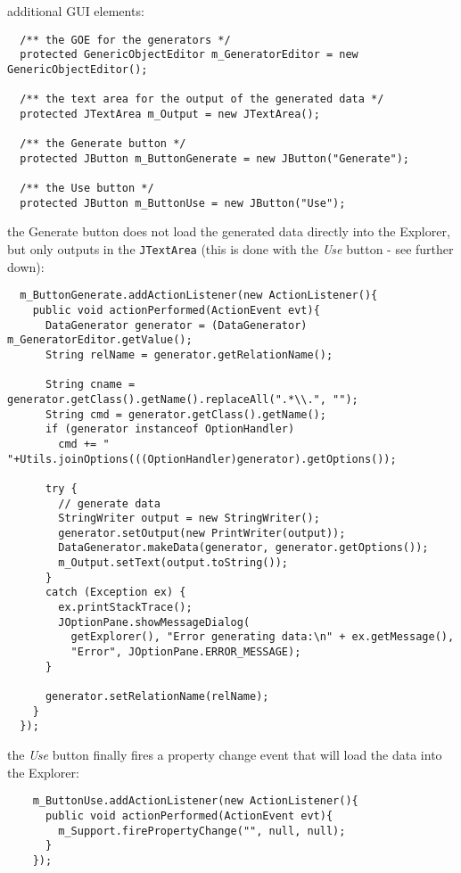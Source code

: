 \begin{tight_itemize}
  \newpage
  \item additional GUI elements:
  \begin{verbatim}
  /** the GOE for the generators */
  protected GenericObjectEditor m_GeneratorEditor = new GenericObjectEditor();

  /** the text area for the output of the generated data */
  protected JTextArea m_Output = new JTextArea();

  /** the Generate button */
  protected JButton m_ButtonGenerate = new JButton("Generate");

  /** the Use button */
  protected JButton m_ButtonUse = new JButton("Use");
  \end{verbatim}

  \item the Generate button does not load the generated data directly into the
Explorer, but only outputs in the \texttt{JTextArea} (this is done with the
\textit{Use} button - see further down):
  \begin{verbatim}
  m_ButtonGenerate.addActionListener(new ActionListener(){
    public void actionPerformed(ActionEvent evt){
      DataGenerator generator = (DataGenerator) m_GeneratorEditor.getValue();
      String relName = generator.getRelationName();

      String cname = generator.getClass().getName().replaceAll(".*\\.", "");
      String cmd = generator.getClass().getName();
      if (generator instanceof OptionHandler)
        cmd += " "+Utils.joinOptions(((OptionHandler)generator).getOptions());

      try {
        // generate data
        StringWriter output = new StringWriter();
        generator.setOutput(new PrintWriter(output));
        DataGenerator.makeData(generator, generator.getOptions());
        m_Output.setText(output.toString());
      }
      catch (Exception ex) {
        ex.printStackTrace();
        JOptionPane.showMessageDialog(
          getExplorer(), "Error generating data:\n" + ex.getMessage(),
          "Error", JOptionPane.ERROR_MESSAGE);
      }

      generator.setRelationName(relName);
    }
  });
  \end{verbatim}

  \item the \textit{Use} button finally fires a property change event that will
load the data into the Explorer:
  \begin{verbatim}
    m_ButtonUse.addActionListener(new ActionListener(){
      public void actionPerformed(ActionEvent evt){
        m_Support.firePropertyChange("", null, null);
      }
    });
  \end{verbatim}


\end{tight_itemize}
